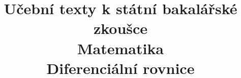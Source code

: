 \clearpage

\clearpage

\title{\LARGE Učební texty k státní bakalářské zkoušce \\ Matematika \\ Diferenciální rovnice}



\maketitle

\newpage
\setcounter{section}{6}



